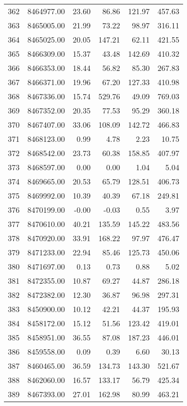 \begin{table}[ht]
\begin{tabular}{rrrrrr}
  362 & 8464977.00 & 23.60 & 86.86 & 121.97 & 457.63 \\ 
  363 & 8465005.00 & 21.99 & 73.22 & 98.97 & 316.11 \\ 
  364 & 8465025.00 & 20.05 & 147.21 & 62.11 & 421.55 \\ 
  365 & 8466309.00 & 15.37 & 43.48 & 142.69 & 410.32 \\ 
  366 & 8466353.00 & 18.44 & 56.82 & 85.30 & 267.83 \\ 
  367 & 8466371.00 & 19.96 & 67.20 & 127.33 & 410.98 \\ 
  368 & 8467336.00 & 15.74 & 529.76 & 49.09 & 769.03 \\ 
  369 & 8467352.00 & 20.35 & 77.53 & 95.29 & 360.18 \\ 
  370 & 8467407.00 & 33.06 & 108.09 & 142.72 & 466.83 \\ 
  371 & 8468123.00 & 0.99 & 4.78 & 2.23 & 10.75 \\ 
  372 & 8468542.00 & 23.73 & 60.38 & 158.85 & 407.97 \\ 
  373 & 8468597.00 & 0.00 & 0.00 & 1.04 & 5.04 \\ 
  374 & 8469665.00 & 20.53 & 65.79 & 128.51 & 406.73 \\ 
  375 & 8469992.00 & 10.39 & 40.39 & 67.18 & 249.81 \\ 
  376 & 8470199.00 & -0.00 & -0.03 & 0.55 & 3.97 \\ 
  377 & 8470610.00 & 40.21 & 135.59 & 145.22 & 483.56 \\ 
  378 & 8470920.00 & 33.91 & 168.22 & 97.97 & 476.47 \\ 
  379 & 8471233.00 & 22.94 & 85.46 & 125.73 & 450.06 \\ 
  380 & 8471697.00 & 0.13 & 0.73 & 0.88 & 5.02 \\ 
  381 & 8472355.00 & 10.87 & 69.27 & 44.87 & 286.18 \\ 
  382 & 8472382.00 & 12.30 & 36.87 & 96.98 & 297.31 \\ 
  383 & 8450900.00 & 10.12 & 42.21 & 44.37 & 195.93 \\ 
  384 & 8458172.00 & 15.12 & 51.56 & 123.42 & 419.01 \\ 
  385 & 8458951.00 & 36.55 & 87.08 & 187.23 & 446.01 \\ 
  386 & 8459558.00 & 0.09 & 0.39 & 6.60 & 30.13 \\ 
  387 & 8460465.00 & 36.59 & 134.73 & 143.30 & 521.67 \\ 
  388 & 8462060.00 & 16.57 & 133.17 & 56.79 & 425.34 \\ 
  389 & 8467393.00 & 27.01 & 162.98 & 80.99 & 463.21 \\ 

\end{tabular}
\end{table}
